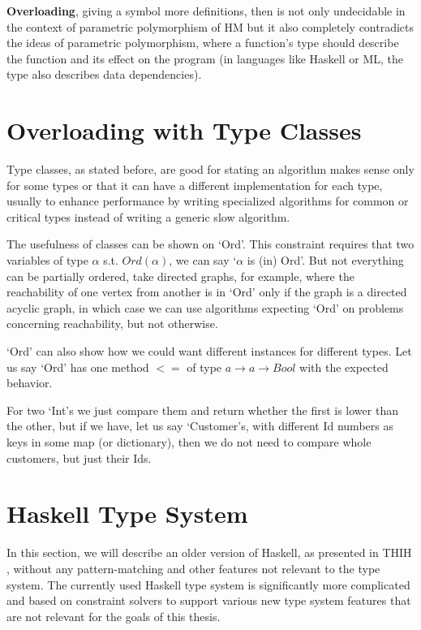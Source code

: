 \textbf{Overloading}, giving a symbol more definitions, then is not only undecidable in the context of parametric polymorphism of HM but it also completely contradicts the ideas of parametric polymorphism, where a function's type should describe the function and its effect on the program (in languages like Haskell or ML, the type also describes data dependencies). \cite{palsberg2012overloading}

\section{Overloading with Type Classes}

Type classes, as stated before, are good for stating an algorithm makes sense only for some types or that it can have a different implementation for each type, usually to enhance performance by writing specialized algorithms for common or critical types instead of writing a generic slow algorithm.

The usefulness of classes can be shown on `Ord'. This constraint requires that two variables of type $\alpha$ s.t. $Ord(\alpha)$, we can say `$\alpha$ is (in) Ord'. But not everything can be partially ordered, take directed graphs, for example, where the reachability of one vertex from another is in `Ord' only if the graph is a directed acyclic graph, in which case we can use algorithms expecting `Ord' on problems concerning reachability, but not otherwise.

`Ord' can also show how we could want different instances for different types. Let us say `Ord' has one method $<=$ of type $a \rightarrow a \rightarrow Bool$ with the expected behavior.

For two `Int's we just compare them and return whether the first is lower than the other, but if we have, let us say `Customer's, with different Id numbers as keys in some map (or dictionary), then we do not need to compare whole customers, but just their Ids.

\section{Haskell Type System}

In this section, we will describe an older version of Haskell, as presented in THIH \cite{jones1999typing}, without any pattern-matching and other features not relevant to the type system. The currently used Haskell type system is significantly more complicated and based on constraint solvers to support various new type system features that are not relevant for the goals of this thesis.


